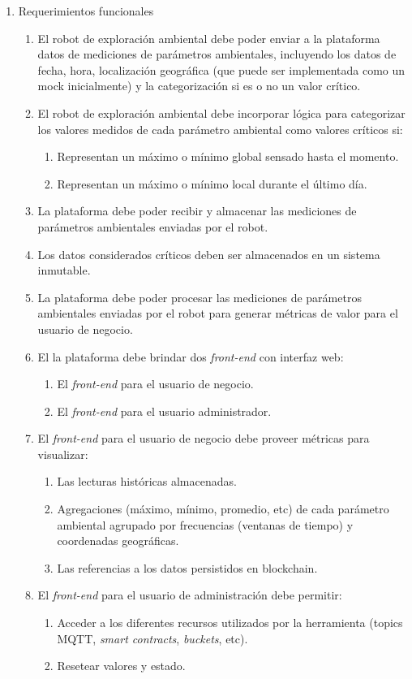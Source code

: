 \documentclass[
11pt, %
]{charter}
\begin{document}
\begin{enumerate}	
	\item Requerimientos funcionales		
	\begin{enumerate}	
		
		\item El robot de exploración ambiental debe poder enviar a la plataforma datos de mediciones de parámetros ambientales, incluyendo los datos de fecha, hora, localización geográfica (que puede ser implementada como un mock inicialmente) y la categorización si es o no un valor crítico.
		\item El robot de exploración ambiental debe incorporar lógica para categorizar los valores medidos de cada parámetro ambiental como valores críticos si:
		\begin{enumerate}				
			\item Representan un máximo o mínimo global sensado hasta el momento.				
			\item Representan un máximo o mínimo local durante el último día.				
		\end{enumerate}			
		\item La plataforma debe poder recibir y almacenar las mediciones de parámetros ambientales enviadas por el robot.
		\item Los datos considerados críticos deben ser almacenados en un sistema inmutable.
		\item La plataforma debe poder procesar las mediciones de parámetros ambientales enviadas por el robot para generar métricas de valor para el usuario de negocio.		
		\item El la plataforma debe brindar dos \textit{front-end} con interfaz web:
			\begin{enumerate}				
				\item El \textit{front-end} para el usuario de negocio.				
				\item El \textit{front-end} para el usuario administrador.				
			\end{enumerate}			
		
		\item El \textit{front-end} para el usuario de negocio debe proveer métricas para visualizar:
			\begin{enumerate}				
				\item Las lecturas históricas almacenadas.				
				\item Agregaciones (máximo, mínimo, promedio, etc) de cada parámetro ambiental agrupado por frecuencias (ventanas de tiempo) y coordenadas geográficas.				
				\item Las referencias a los datos persistidos en blockchain.
			\end{enumerate}			
		\item El \textit{front-end} para el usuario de administración debe permitir:
			\begin{enumerate}				
				\item Acceder a los diferentes recursos utilizados por la herramienta (topics MQTT, \textit{smart contracts}, \textit{buckets}, etc).
				\item Resetear valores y estado.			
			\end{enumerate}			
		\end{enumerate}	


\end{enumerate}
\end{document}
